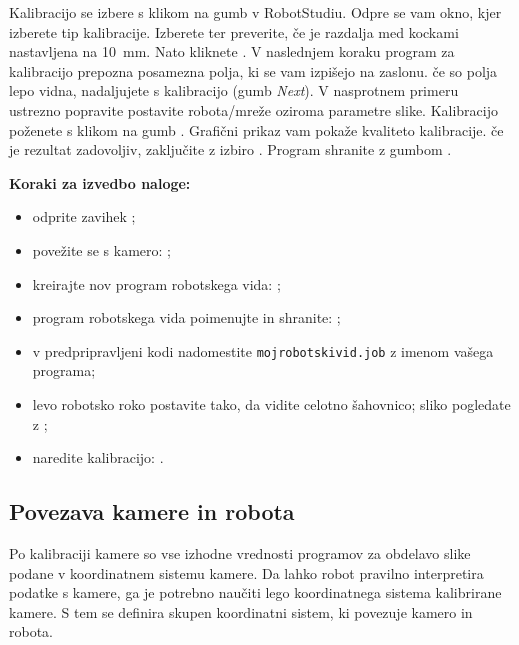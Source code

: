 Kalibracijo se izbere s klikom na gumb  v RobotStudiu. Odpre se vam okno, kjer izberete tip kalibracije. Izberete  ter preverite, če je razdalja med kockami nastavljena na 10~mm. Nato kliknete . V naslednjem koraku program za kalibracijo prepozna posamezna polja, ki se vam izpišejo na zaslonu. če so polja lepo vidna, nadaljujete s kalibracijo (gumb \emph{Next}). V nasprotnem primeru ustrezno popravite postavite robota/mreže oziroma parametre slike. Kalibracijo poženete s klikom na gumb . Grafični prikaz vam pokaže kvaliteto kalibracije. če je rezultat zadovoljiv,  zaključite z izbiro . Program shranite z gumbom .

\vspace{5mm}

\begin{mdframed}[backgroundcolor=yellow!20, shadow=true,roundcorner=8pt]
\textbf{Koraki za izvedbo naloge:}
\begin{itemize}
  \item odprite zavihek ;
  \item povežite se s kamero: ;
  \item kreirajte nov program robotskega vida: ;
  \item program robotskega vida poimenujte in shranite: ;
  \item v predpripravljeni kodi nadomestite \verb"mojrobotskivid.job" z imenom vašega programa;
  \item levo robotsko roko postavite tako, da vidite celotno šahovnico; sliko pogledate z ;
  \item naredite kalibracijo: .
\end{itemize}
\end{mdframed}


\subsection{Povezava kamere in robota}


Po kalibraciji kamere so vse izhodne vrednosti programov za obdelavo slike podane v koordinatnem sistemu kamere. Da lahko robot pravilno interpretira podatke s kamere, ga je potrebno naučiti lego koordinatnega sistema kalibrirane kamere. S tem se definira skupen koordinatni sistem, ki povezuje kamero in robota.

